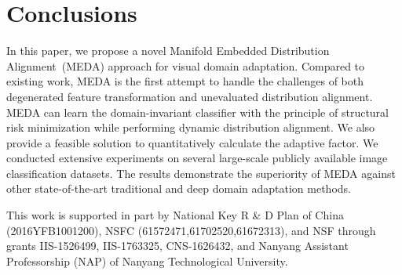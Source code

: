 \documentclass[sigconf]{acmart}
\begin{document}
\label{sec-con}
\section{Conclusions}

In this paper, we propose a novel Manifold Embedded Distribution Alignment~(MEDA) approach for visual domain adaptation. Compared to existing work, MEDA is the first attempt to handle the challenges of both degenerated feature transformation and unevaluated distribution alignment. MEDA can learn the domain-invariant classifier with the principle of structural risk minimization while performing dynamic distribution alignment. We also provide a feasible solution to quantitatively calculate the adaptive factor. We conducted extensive experiments on several large-scale publicly available image classification datasets. The results demonstrate the superiority of MEDA against other state-of-the-art traditional and deep domain adaptation methods. 



\begin{acks}
	This work is supported in part by National Key R \& D Plan of China (2016YFB1001200), NSFC
	(61572471,61702520,61672313), and NSF through grants IIS-1526499, IIS-1763325, CNS-1626432, and Nanyang Assistant Professorship (NAP) of Nanyang Technological University.
	
\end{acks}




\end{document}
